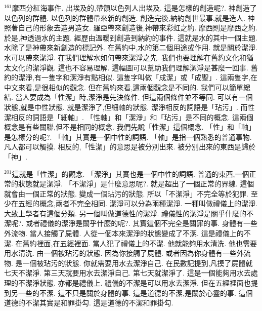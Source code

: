 \documentclass{book}
\begin{document}
$^{161}$摩西分紅海事件.
出埃及的,帶領以色列人出埃及.
這是怎樣的創造呢?.
神創造了以色列的群體.
以色列的群體帶來新的創造.
創造完後,納約創世最事,就是造人.
神照著自己的形象去造男造女.
羅亞帶來創造後,神帶來彩虹之約.
摩西則是摩西之約.
於是,神透過水的主題.
經歷由溫暖到創造到納約的事件.
這就是水的其中一個主題.
水除了是神帶來新創造的標記外.
在舊約中,水的第二個用途或作用.
就是關於潔淨.
水可以帶來潔淨.
在我們理解水如何帶來潔淨之先.
我們也要理解在舊約文化和猶太文化的潔淨觀.
這也不容易理解.
這幅圖可以幫助我們理解潔淨是甚麼一回事.
舊約的潔淨,有一隻字和潔淨有點相似.
這隻字叫做「成潔」或「成聖」.
這兩隻字,在中文來看,是很相似的觀念.
但在舊約來看,這兩個觀念是不同的.
我們可以簡單總結.
當人要成為「性潔」時,潔淨是先決條件.
但這兩個條件並不等同.
可以有一個狀態,就是中性狀態.
就是潔淨了,但細軸的狀態.
潔淨相反的詞語是「玷污」.
而性潔相反的詞語是「細軸」.
「性軸」和「潔淨」和「玷污」是不同的概念.
這兩個概念是有些關聯,但不是相同的概念.
我們先說「性潔」這個概念.
「性」和「軸」是怎樣分的呢?.
「軸」其實是一個中性的詞語.
「軸」是指一個熟悉的普通事物.
凡人都可以觸摸.
相反的,「性潔」的意思是被分別出來.
被分別出來的東西是歸於「神」.

$^{201}$這就是「性潔」的觀念.
「潔淨」其實也是一個中性的詞語.
普通的東西,一個正常的狀態就是潔淨.
「不潔淨」是什麼意思呢?.
就是超出了一個正常的界線.
這個就會由一個正常的狀態.
變成一個玷污的狀態.
所以「不潔淨」不完全等於犯罪.
至少在五經的概念,兩者不完全相同.
潔淨可以分為兩種潔淨.
一種叫做禮儀上的潔淨.
大致上學者有這個分類.
另一個叫做道德性的潔淨.
禮儀性的潔淨是關乎什麼的不潔呢?.
或者禮儀的潔淨是關乎什麼的呢?.
其實這個不完全是關罪的事.
身體有一些外流物.
當人接觸了屍體.
人從一個本來潔淨的狀態變成了不潔.
這是禮儀上的不潔.
在舊約裡面,在五經裡面.
當人犯了禮儀上的不潔.
他就能夠用水清洗.
他也需要用水清洗.
由一個被玷污的狀態.
因為你接觸了屍體.
或者因為你身體有一些外流物.
是一個被玷污的狀態.
你就需要用水去潔淨自己.
在民數記提到,凡摸了屍體就七天不潔淨.
第三天就要用水去潔淨自己.
第七天就潔淨了.
這是一個能夠用水去處理的不潔淨狀態.
亦都是禮儀上.
禮儀的不潔是可以用水去潔淨.
但在五經裡面也提到另一些的不潔.
這不只是關於身體的事.
這是道德的不潔,是關於心靈的事.
這個道德的不潔其實是和罪掛勾.
這是道德的不潔和罪掛勾.
\end{document}
